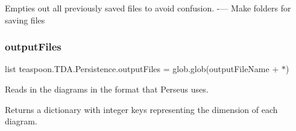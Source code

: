 Empties out all previously saved files to avoid confusion. -\/--- Make folders for saving files \mbox{\label{namespaceteaspoon_1_1_t_d_a_1_1_persistence_ae41c85513e98b32d96c75124929c4d2c}} 
\subsubsection{\texorpdfstring{output\+Files}{outputFiles}}
{\footnotesize\ttfamily list teaspoon.\+T\+D\+A.\+Persistence.\+output\+Files = glob.\+glob(output\+File\+Name + \textquotesingle{}$\ast$\textquotesingle{})}



Reads in the diagrams in the format that Perseus uses. 

Returns a dictionary with integer keys representing the dimension of each diagram. 